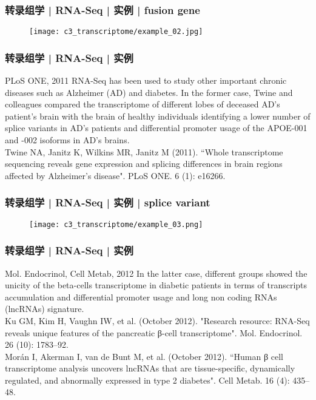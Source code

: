 \begin{frame}
  \frametitle{转录组学 | RNA-Seq | 实例 | fusion gene}
  \begin{figure}
    \centering
    \texttt{[image: c3\_transcriptome/example\_02.jpg]}
  \end{figure}
\end{frame}

\begin{frame}
  \frametitle{转录组学 | RNA-Seq | 实例}
  \begin{block}{PLoS ONE, 2011}
  RNA-Seq has been used to study other important chronic diseases such as Alzheimer (AD) and diabetes. In the former case, Twine and colleagues compared the transcriptome of different lobes of deceased AD's patient's brain with the brain of healthy individuals identifying a lower number of splice variants in AD's patients and differential promoter usage of the APOE-001 and -002 isoforms in AD's brains.\\
  \vspace{0.5em}
Twine NA, Janitz K, Wilkins MR, Janitz M (2011). ``Whole transcriptome sequencing reveals gene expression and splicing differences in brain regions affected by Alzheimer's disease". PLoS ONE. 6 (1): e16266.
  \end{block}
\end{frame}

\begin{frame}
  \frametitle{转录组学 | RNA-Seq | 实例 | splice variant}
  \begin{figure}
    \centering
    \texttt{[image: c3\_transcriptome/example\_03.png]}
  \end{figure}
\end{frame}

\begin{frame}
  \frametitle{转录组学 | RNA-Seq | 实例}
  \begin{block}{Mol. Endocrinol, Cell Metab, 2012}
  In the latter case, different groups showed the unicity of the beta-cells transcriptome in diabetic patients in terms of transcripts accumulation and differential promoter usage and long non coding RNAs (lncRNAs) signature.\\
  \vspace{0.5em}
  Ku GM, Kim H, Vaughn IW, et al. (October 2012). "Research resource: RNA-Seq reveals unique features of the pancreatic β-cell transcriptome". Mol. Endocrinol. 26 (10): 1783–92.\\
  \vspace{0.5em}
  Morán I, Akerman I, van de Bunt M, et al. (October 2012). ``Human β cell transcriptome analysis uncovers lncRNAs that are tissue-specific, dynamically regulated, and abnormally expressed in type 2 diabetes". Cell Metab. 16 (4): 435–48.
  \end{block}
\end{frame}

